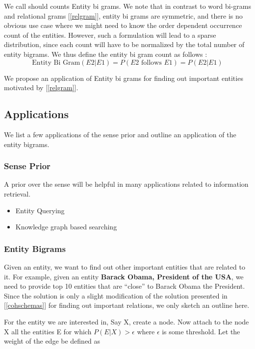 We call should counts Entity bi grams. We note that in contrast to word bi-grams and relational grams [\ref{relgram}], entity bi grams
are symmetric, and there is no obvious use case where we might need to know the order dependent occurrence count of the entities. 
However, such a formulation will lead to a sparse distribution, since each count will have to be normalized by the total number of 
entity bigrams. We thus define the entity bi gram count as follows : 
\begin{equation}
 \tag{2}
 \text{Entity Bi Gram}(E2 | E1) = P(E2\text{ follows }E1) = P(E2 | E1) 
\end{equation}

We propose an application of Entity bi grams for finding out important entities motivated by [\ref{relgram}].

\subsection{Applications}
We list a few applications of the sense prior and outline an application of the entity bigrams.

 \subsubsection{Sense Prior}
 A prior over the sense will be helpful in many applications related to information retrieval. 
 \begin{itemize}
  \item Entity Querying
  \item Knowledge graph based searching
 \end{itemize}

 \subsubsection{Entity Bigrams}
 
 Given an entity, we want to find out other important entities that are related to it.
 For example, given an entity \textbf{Barack Obama, President of the USA}, we need to provide top 10 entities that are
 ``close'' to Barack Obama the President. Since the solution is only a slight modification of the solution 
 presented in [\ref{cohschemas}] for finding out important relations, we only sketch an outline here. 
 
For the entity we are interested in, Say X, create a node. Now attach to the node X all the entities E for which
$P(E|X) >  \epsilon$ where $\epsilon$ is some threshold. Let the weight of the edge be defined as

